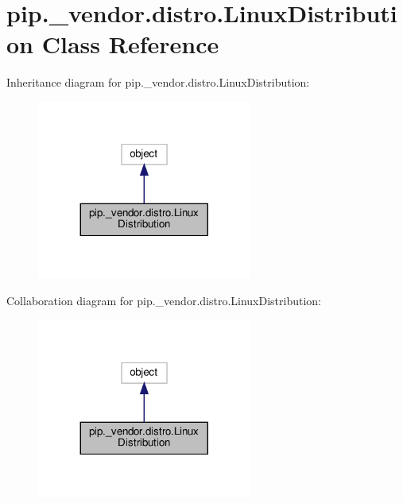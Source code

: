 \hypertarget{classpip_1_1__vendor_1_1distro_1_1LinuxDistribution}{}\section{pip.\+\_\+vendor.\+distro.\+Linux\+Distribution Class Reference}
\label{classpip_1_1__vendor_1_1distro_1_1LinuxDistribution}


Inheritance diagram for pip.\+\_\+vendor.\+distro.\+Linux\+Distribution\+:
\nopagebreak
\begin{figure}[H]
\begin{center}
\leavevmode
\includegraphics[width=200pt]{classpip_1_1__vendor_1_1distro_1_1LinuxDistribution__inherit__graph}
\end{center}
\end{figure}


Collaboration diagram for pip.\+\_\+vendor.\+distro.\+Linux\+Distribution\+:
\nopagebreak
\begin{figure}[H]
\begin{center}
\leavevmode
\includegraphics[width=200pt]{classpip_1_1__vendor_1_1distro_1_1LinuxDistribution__coll__graph}
\end{center}
\end{figure}

